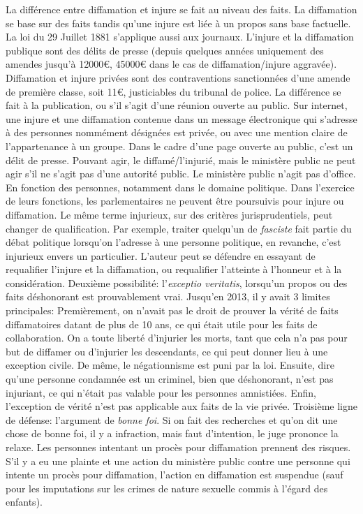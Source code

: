 \documentclass[math]{cours}
\begin{document}
La différence entre diffamation et injure se fait au niveau des faits.
La diffamation se base sur des faits tandis qu'une injure est liée à un propos sans base factuelle.
La loi du 29 Juillet 1881 s'applique aussi aux journaux.
L'injure et la diffamation publique sont des délits de presse (depuis quelques années uniquement des amendes jusqu'à 12000€, 45000€ dans le cas de diffamation/injure aggravée).
Diffamation et injure privées sont des contraventions sanctionnées d'une amende de première classe, soit 11€, justiciables du tribunal de police.
La différence se fait à la publication, ou s'il s'agit d'une réunion ouverte au public.
Sur internet, une injure et une diffamation contenue dans un message électronique qui s'adresse à des personnes nommément désignées est privée, ou avec une mention claire de l'appartenance à un groupe.
Dans le cadre d'une page ouverte au public, c'est un délit de presse.
Pouvant agir, le diffamé/l'injurié, mais le ministère public ne peut agir s'il ne s'agit pas d'une autorité public.
Le ministère public n'agit pas d'office.
En fonction des personnes, notamment dans le domaine politique.
Dans l'exercice de leurs fonctions, les parlementaires ne peuvent être poursuivis pour injure ou diffamation.
Le même terme injurieux, sur des critères jurisprudentiels, peut changer de qualification.
Par exemple, traiter quelqu'un de \textit{fasciste} fait partie du débat politique lorsqu'on l'adresse à une personne politique, en revanche, c'est injurieux envers un particulier.
L'auteur peut se défendre en essayant de requalifier l'injure et la diffamation, ou requalifier l'atteinte à l'honneur et à la considération.
Deuxième possibilité: l'\textit{exceptio veritatis}, lorsqu'un propos ou des faits déshonorant est prouvablement vrai.
Jusqu'en 2013, il y avait 3 limites principales: Premièrement, on n'avait pas le droit de prouver la vérité de faits diffamatoires datant de plus de 10 ans, ce qui était utile pour les faits de collaboration.
On a toute liberté d'injurier les morts, tant que cela n'a pas pour but de diffamer ou d'injurier les descendants, ce qui peut donner lieu à une exception civile.
De même, le négationnisme est puni par la loi.
Ensuite, dire qu'une personne condamnée est un criminel, bien que déshonorant, n'est pas injuriant, ce qui n'était pas valable pour les personnes amnistiées.
Enfin, l'exception de vérité n'est pas applicable aux faits de la vie privée.
Troisième ligne de défense: l'argument de \textit{bonne foi}.
Si on fait des recherches et qu'on dit une chose de bonne foi, il y a infraction, mais faut d'intention, le juge prononce la relaxe.
Les personnes intentant un procès pour diffamation prennent des risques.
S'il y a eu une plainte et une action du ministère public contre une personne qui intente un procès pour diffamation, l'action en diffamation est suspendue (sauf pour les imputations sur les crimes de nature sexuelle commis à l'égard des enfants).
\end{document}
